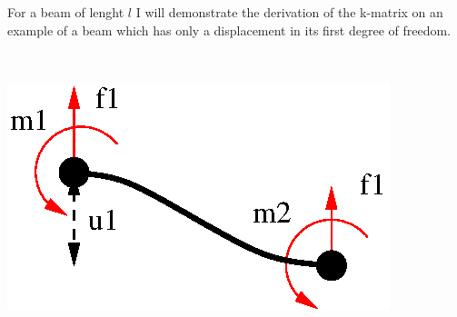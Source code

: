 \begin{minipage}{\textwidth}
    \begin{minipage}[t]{0.5\textwidth}
     
     For a beam of lenght $l$ I will demonstrate the derivation of the k-matrix on an example of a beam which has only a displacement in its first degree of freedom.
    \end{minipage}
    \hfill
    \begin{minipage}[t]{0.5\textwidth}				%
      ~\\[-1ex]%
       
      \centerline{
      \includegraphics[scale=1]{deformBar1.eps}}
    \end{minipage}
  \end{minipage}